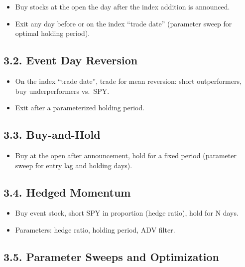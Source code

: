 \documentclass[11pt]{article}
\providecommand{\tightlist}{%
      \setlength{\itemsep}{0pt}\setlength{\parskip}{0pt}}
\begin{document}
\begin{itemize}
\tightlist
\item
  Buy stocks at the open the day after the index addition is announced.
\item
  Exit any day before or on the index ``trade date'' (parameter sweep
  for optimal holding period).
\end{itemize}

\subsection*{3.2. Event Day Reversion}\label{event-day-reversion}

\begin{itemize}
\tightlist
\item
  On the index ``trade date'', trade for mean reversion: short
  outperformers, buy underperformers vs.~SPY.
\item
  Exit after a parameterized holding period.
\end{itemize}

\subsection*{3.3. Buy-and-Hold}\label{buy-and-hold}

\begin{itemize}
\tightlist
\item
  Buy at the open after announcement, hold for a fixed period (parameter
  sweep for entry lag and holding days).
\end{itemize}

\subsection*{3.4. Hedged Momentum}\label{hedged-momentum}

\begin{itemize}
\tightlist
\item
  Buy event stock, short SPY in proportion (hedge ratio), hold for N
  days.
\item
  Parameters: hedge ratio, holding period, ADV filter.
\end{itemize}

\subsection*{3.5. Parameter Sweeps and
Optimization}\label{parameter-sweeps-and-optimization}
\end{document}
